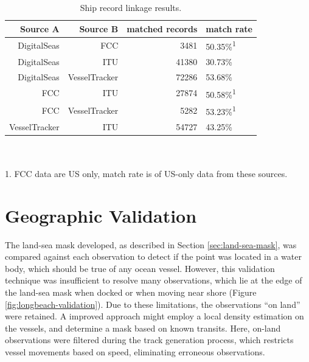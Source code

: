 \begin{table}[htbp]
 \caption[Ship record linkage results]{Ship record linkage results.}
 \hspace*{0.5in}
 \begin{tabular}{rrrl} %
    \hline
    Source \textsf{A} & Source \textsf{B} & matched records & match rate \\
    \hline
     DigitalSeas & FCC &  3481 & 50.35\%\textsuperscript{1}\\
     DigitalSeas & ITU & 41380 & 30.73\% \\
     DigitalSeas & VesselTracker & 72286 & 53.68\% \\
    FCC & ITU & 27874 & 50.58\%\textsuperscript{1} \\
    FCC &  VesselTracker &  5282 & 53.23\%\textsuperscript{1} \\
     VesselTracker & ITU & 54727 & 43.25\% \\
  \end{tabular}
  \\
  \\
    1. \small{FCC data are US only, match rate is of US-only data from these sources.}
  \label{table:ships-record-linkage-results}
\end{table}

\section{Geographic Validation}

The land-sea mask developed, as described in Section \ref{sec:land-sea-mask}, was compared against each observation to detect if the point was located in a water body, which should be true of any ocean vessel. However, this validation technique was insufficient to resolve many observations, which lie at the edge of the land-sea mask when docked %
 or when moving near shore %
(Figure \ref{fig:longbeach-validation}). Due to these limitations, the observations ``on land'' were retained. A improved approach might employ a local density estimation on the vessels, and determine a mask based on known transits. Here, on-land observations were filtered during the track generation process, which restricts vessel movements based on speed, eliminating erroneous observations.

